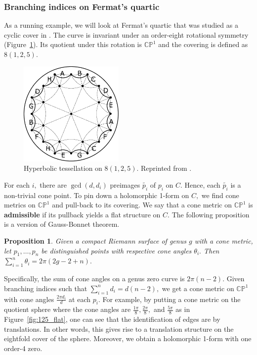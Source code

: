 \documentclass[12pt,reqno]{amsart}
\newtheorem*{proposition}{Proposition}
\theoremstyle{definition}
\theoremstyle{remark}
\begin{document}
\subsubsection*{Branching indices on Fermat's quartic}
As a running example, we will look at Fermat's quartic that was studied as a cyclic cover in \cite{dami}. The curve is invariant under an order-eight rotational symmetry (Figure~\ref{fig:125}). Its quotient under this rotation is $\mathbb{C}\mathbb{P}^1$ and the covering is defined as $8 (1, 2, 5).$

\begin{figure}[htbp] 
   \centering
   \includegraphics[width=2in]{figures/125_base.pdf} 
  \caption{Hyperbolic tessellation on $8(1, 2, 5).$ Reprinted from \cite{dami}.}
  \label{fig:125}
\end{figure}


For each $i,$ there are $\gcd(d, d_i)$ preimages $\widetilde{p_i}$ of $p_i$ on $C.$ Hence, each $\widetilde{p_i}$ is a non-trivial cone point. To pin down a holomorphic 1-form on $C,$ we find cone metrics on $\mathbb{C}\mathbb{P}^1$ and pull-back to its covering. We say that a cone metric on $\mathbb{C}\mathbb{P}^1$ is \textbf{admissible} if its pullback yields a flat structure on $C.$ The following proposition is a version of Gauss-Bonnet theorem.

\begin{proposition} Given a compact Riemann surface of genus $g$ with a cone metric, let $p_1, \ldots, p_n$ be distinguished points with respective cone angles $\theta_i.$ Then $\sum\limits_{i=1}^n \theta_i = 2 \pi (2 g - 2 + n).$
\end{proposition}

Specifically, the sum of cone angles on a genus zero curve is $2 \pi (n - 2).$ Given branching indices such that $\sum\limits_{i=1}^n d_i = d (n - 2),$ we get a cone metric on $\mathbb{C}\mathbb{P}^1$ with cone angles $\frac{2 \pi d_i}{d}$ at each $p_i.$ For example, by putting a cone metric on the quotient sphere where the cone angles are $\frac{1 \pi}{8}, \frac{2 \pi}{8},$ and $\frac{5 \pi}{8}$ as in Figure~\ref{fig:125_flat}, one can see that the identification of edges are by translations. In other words, this gives rise to a translation structure on the eightfold cover of the sphere. Moreover, we obtain a holomorphic 1-form with one order-4 zero.
\end{document}
